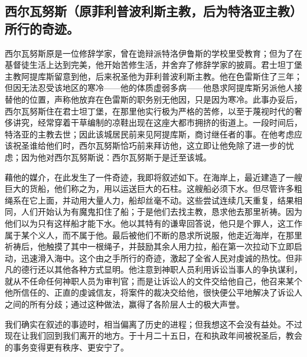 
\subsection{西尔瓦努斯（原菲利普波利斯主教，后为特洛亚主教）所行的奇迹。\newline{}}

西尔瓦努斯原是一位修辞学家，曾在诡辩派特洛伊鲁斯的学校里受教育；但为了在基督徒生活上达到完美，他开始苦修生活，并舍弃了修辞学家的披肩。君士坦丁堡主教阿提库斯留意到他，后来祝圣他为菲利普波利斯主教。他在色雷斯住了三年；但因无法忍受该地区的寒冷——他的体质虚弱多病——他恳求阿提库斯另派他人接替他的位置，声称他放弃在色雷斯的职务别无他因，只是因为寒冷。此事办妥后，西尔瓦努斯住在君士坦丁堡，在那里他实行极为严格的苦修，以至于蔑视时代的奢侈讲究，经常穿着干草编制的凉鞋出现在这座大都市拥挤的街道上。一段时间后，特洛亚的主教去世；因此该城居民前来见阿提库斯，商讨继任者的事。在他考虑应该祝圣谁给他们时，西尔瓦努斯恰巧前来拜访他，这立即让他免除了进一步的忧虑；因为他对西尔瓦努斯说：西尔瓦努斯于是迁至该城。\newline{}\par

藉他的媒介，在此发生了一件奇迹，我即将叙述如下。在海岸上，最近建造了一艘巨大的货船，他们称之为，用以运送巨大的石柱。这艘船必须下水。但尽管许多粗绳系在它上面，并动用大量人力，船却丝毫不动。这些尝试连续几天重复，结果相同，人们开始认为有魔鬼扣住了船；于是他们去找主教，恳求他去那里祈祷。因为他们以为只有这样船才能下水。他以其特有的谦卑回答说，他只是个罪人，这工作属于某个义人，而不属于他。最后被他们不断的恳求所说服，他走近海岸，在那里祈祷后，他触摸了其中一根绳子，并鼓励其余人用力拉，船在第一次拉动下立即启动，迅速滑入海中。这个由之手所行的奇迹，激起了全省人民对虔诚的热忱。但非凡的德行还以其他各种方式显明。他注意到神职人员利用诉讼当事人的争执谋利，就从不任命任何神职人员为审判官；而是让诉讼人的文件交给他自己，他召来某个他所信任的、正直的虔诚信友，将案件的裁决交给他，很快便公平地解决了诉讼人之间的所有分歧；通过这种做法，赢得了各阶层人士的极大声誉。\par

我们确实在叙述的事迹时，相当偏离了历史的进程；但我想这不会没有益处。不过现在让我们回到我们离开的地方。于十月二十五日，在和执政年间被祝圣后，教会的事务变得更有秩序、更安宁了。\par

